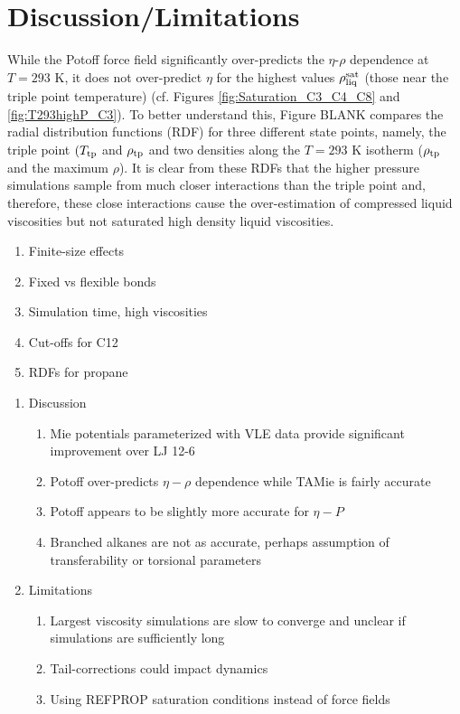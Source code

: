 \documentclass[preprint,review,12pt]{elsarticle}
\begin{document}
	\section{Discussion/Limitations} \label{Discussion/Limitations}
	
	While the Potoff force field significantly over-predicts the $\eta$-$\rho$ dependence at $T= 293$ K, it does not over-predict $\eta$ for the highest values $\rho_{\rm liq}^{\rm sat}$ (those near the triple point temperature) (cf. Figures \ref{fig:Saturation_C3_C4_C8} and \ref{fig:T293highP_C3}). To better understand this, Figure BLANK compares the radial distribution functions (RDF) for three different state points, namely, the triple point $(T_{\rm tp}$ and $\rho_{\rm tp}$ and two densities along the $T = 293$ K isotherm ($\rho_{\rm tp}$ and the maximum $\rho$). It is clear from these RDFs that the higher pressure simulations sample from much closer interactions than the triple point and, therefore, these close interactions cause the over-estimation of compressed liquid viscosities but not saturated high density liquid viscosities.
	
	\begin{enumerate}
		\item Finite-size effects
		\item Fixed vs flexible bonds
		\item Simulation time, high viscosities
		\item Cut-offs for C12
		\item RDFs for propane
	\end{enumerate}
	
	\begin{enumerate}
		\item Discussion
		\begin{enumerate}
			\item Mie potentials parameterized with VLE data provide significant improvement over LJ 12-6
			\item Potoff over-predicts $\eta-\rho$ dependence while TAMie is fairly accurate
			\item Potoff appears to be slightly more accurate for $\eta-P$
			\item Branched alkanes are not as accurate, perhaps assumption of transferability or torsional parameters
		\end{enumerate}
		\item Limitations
		\begin{enumerate}
			\item Largest viscosity simulations are slow to converge and unclear if simulations are sufficiently long
			\item Tail-corrections could impact dynamics
			\item Using REFPROP saturation conditions instead of force fields
		\end{enumerate}
	\end{enumerate}
	
\end{document}
